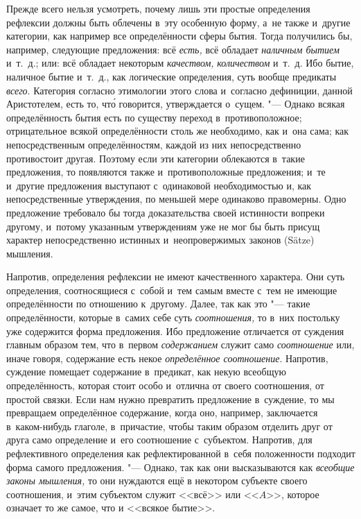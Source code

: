 Прежде всего нельзя усмотреть, почему лишь эти простые определения рефлексии
должны быть облечены в~эту особенную форму, а~не также и~другие категории,
как например все определённости сферы бытия. Тогда получились бы, например,
следующие предложения: всё {\em есть,} всё обладает
{\em наличным бытием} и~т.~д.; или: всё обладает некоторым {\em качеством,}
{\em количеством} и~т.~д. Ибо бытие, наличное бытие
и~т.~д., как логические определения, суть вообще предикаты
{\em всего}. Категория согласно этимологии этого слова
и~согласно дефиниции, данной Аристотелем, есть то, чт\'{о} говорится,
утверждается о~сущем. "--- Однако всякая определённость бытия есть по существу
переход в~противоположное; отрицательное всякой определённости столь же
необходимо, как и~она сама; как непосредственным определённостям, каждой из
них непосредственно противостоит другая. Поэтому если эти категории
облекаются в~такие предложения, то появляются также и~противоположные
предложения; и~те и~другие предложения выступают с~одинаковой
необходимостью и, как непосредственные утверждения, по меньшей мере
одинаково правомерны. Одно предложение требовало бы тогда доказательства
своей истинности вопреки другому, и~потому указанным утверждениям уже не
мог бы быть присущ характер непосредственно истинных и~неопровержимых
законов (Sätze) мышления.

Напротив, определения рефлексии не имеют качественного характера. Они суть
определения, соотносящиеся с~собой и~тем самым вместе с~тем не имеющие
определённости по отношению к~другому. Далее, так как это "--- такие
определённости, которые в~самих себе суть
{\em соотношения,} то в~них постольку уже содержится
форма предложения. Ибо предложение отличается от суждения главным образом
тем, что в~первом {\em содержанием} служит само
{\em соотношение} или, иначе говоря, содержание есть
некое {\em определённое соотношение}. Напротив,
суждение помещает содержание в~предикат, как некую всеобщую определённость,
которая стоит особо и~отлична от своего соотношения, от простой связки.
Если нам нужно превратить предложение в~суждение, то мы превращаем
определённое содержание, когда оно, например, заключается в~каком-нибудь
глаголе, в~причастие, чтобы таким образом отделить друг от друга само
определение и~его соотношение с~субъектом. Напротив, для рефлективного
определения как рефлектированной в~себя положенности подходит форма самого
предложения. "--- Однако, так как они высказываются как
{\em всеобщие законы мышления,} то они нуждаются ещё в
некотором субъекте своего соотношения, и~этим субъектом служит <<всё>> или
<<$A$>>, которое означает то же самое, что и <<всякое бытие>>.

